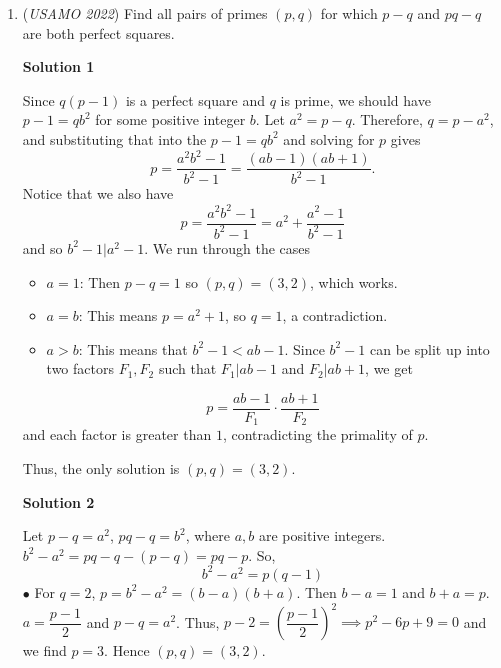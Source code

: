 \begin{enumerate}
 Multiplying $\frac{xz(x+f(z))}{d}$ on both sides give $z(x+f(z))=xz+d$, so $f(z)=\frac{d}{z}$.

 We have finally proved that, for all $z$, it is true that $f(z)=\frac{d}{z}$; and we thus conclude our final answer, that 
 \[\boxed{f(x)=\frac{d}{x}}\] where $d\in\mathbb{R}_{>0}$. 

 


	\item (\textit{USAMO 2022}) Find all pairs of primes $(p, q)$ for which $p-q$ and $pq-q$ are both perfect squares.


 



\textbf{Solution 1}

Since $q(p-1)$ is a perfect square and $q$ is prime, we should have $p - 1 = qb^2$ for some positive integer $b$. Let $a^2 = p - q$. Therefore, $q = p - a^2$, and substituting that into the $p - 1 = qb^2$ and solving for $p$ gives
 \[p = \frac{a^2b^2 - 1}{b^2 - 1} = \frac{(ab - 1)(ab + 1)}{b^2 - 1}.\]Notice that we also have
 \[p = \frac{a^2b^2 - 1}{b^2 - 1} = a^2 + \frac{a^2 - 1}{b^2 - 1}\]and so $b^2 - 1 | a^2 - 1$. We run through the cases

 
            \begin{itemize}
        \item $a = 1$: Then $p - q = 1$ so $(p, q) = (3, 2)$, which works.
        \item $a = b$: This means $p = a^2 + 1$, so $q = 1$, a contradiction.
        \item $a > b$: This means that $b^2 - 1 < ab - 1$. Since $b^2 - 1$ can be split up into two factors $F_1, F_2$ such that $F_1 | ab - 1$ and $F_2 | ab + 1$, we get
            \end{itemize}
            
 \[p = \frac{ab - 1}{F_1} \cdot \frac{ab + 1}{F_2}\]and each factor is greater than $1$, contradicting the primality of $p$.

 Thus, the only solution is $(p, q) = (3, 2)$.

 



\textbf{Solution 2}

Let $p-q = a^2$, $pq - q = b^2$, where $a, b$ are positive integers. $b^2 - a^2 = pq - q - (p-q) = pq -p$. So,
 \[b^2 - a^2 = p(q-1) \tag{1}\]
$\bullet$ For $q=2$, $p = b^2 - a^2 = (b-a)(b+a)$. Then $b-a=1$ and $b+a=p$. $a=\dfrac{p-1}{2}$ and $p-q = a^2$. Thus, $p - 2 = \left( \dfrac{p-1}{2} \right)^2 \implies p^2 - 6p + 9 = 0$ and we find $p=3$. Hence $(p,q) = (3,2)$.


\end{enumerate}
